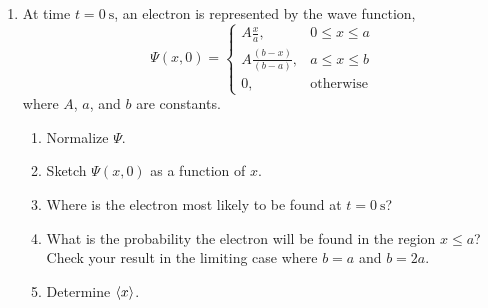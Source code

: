 \documentclass[a4paper, 12pt]{config/homework}
\begin{document}
\begin{enumerate}
\pagebreak
\item At time \(t=\qty{0}{\second}\), an electron is represented by the wave function,
\[\Psi(x, 0) = \begin{cases}
    A\frac{x}{a}, & 0 \le x \le a \\
    A \frac{(b-x)}{(b-a)}, & a \le x \le b \\
    0, & \text{otherwise}
\end{cases}\]
where \(A\), \(a\), and \(b\) are constants.
\begin{enumerate}[label=(\alph*)]
\item Normalize \(\Psi\).
\item Sketch \(\Psi(x,0)\) as a function of \(x\).
\item Where is the electron most likely to be found at \(t=\qty{0}{\second}\)?
\item What is the probability the electron will be found in the region \(x \le a\)? Check your result in the limiting case where \(b=a\) and \(b=2a\).
\item Determine \(\braket{x}\).
\end{enumerate}
\end{enumerate}
\end{document}
